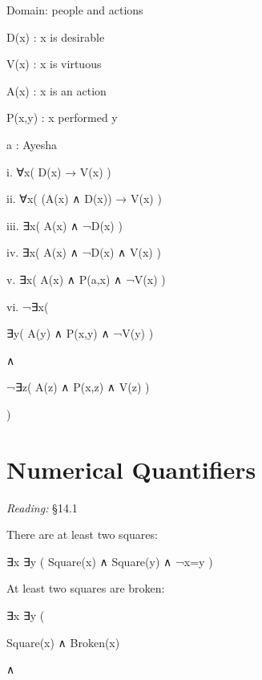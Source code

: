 \documentclass[12pt]{extarticle}
\begin{document}
\begin{multicols*}{3}
\hspace{5mm} \begin{minipage}{\columnwidth}
 
\hspace{5mm} Domain: {people and actions}
 
\hspace{5mm} D(x) : x is desirable
 
\hspace{5mm} V(x) : x is virtuous
 
\hspace{5mm} A(x) : x is an action
 
\hspace{5mm} P(x,y) : x performed y
 
\hspace{5mm} a : Ayesha
 
\end{minipage}
 
i. ∀x( D(x) → V(x) )
 
ii. ∀x( (A(x) ∧ D(x)) → V(x) )
 
iii. ∃x( A(x) ∧ ¬D(x) )
 
iv. ∃x( A(x) ∧ ¬D(x) ∧ V(x) )
 
v. ∃x( A(x) ∧ P(a,x) ∧ ¬V(x) )
 
vi. ¬∃x(
 
\hspace{5mm} ∃y( A(y) ∧ P(x,y) ∧ ¬V(y) )
 
\hspace{5mm} ∧
 
\hspace{5mm} ¬∃z( A(z) ∧ P(x,z) ∧ V(z) )
 
)
 
 
 
\section{Numerical Quantifiers}
 
\emph{Reading:} §14.1
 
There are at least two squares:
 
\hspace{5mm} ∃x ∃y ( Square(x) ∧ Square(y) ∧ ¬x=y )
 
At least two squares are broken:
 
\hspace{5mm} ∃x ∃y (
 
\hspace{10mm} Square(x) ∧ Broken(x)
 
\hspace{10mm} ∧
 

\end{multicols*}
\end{document}
